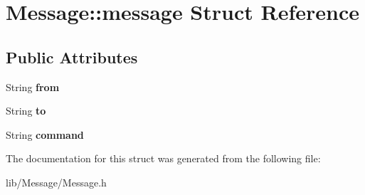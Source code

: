 \hypertarget{struct_message_1_1message}{}\section{Message\+:\+:message Struct Reference}
\label{struct_message_1_1message}
\subsection*{Public Attributes}
\begin{DoxyCompactItemize}
\item 
\mbox{\label{struct_message_1_1message_afb336c68657804a63ae70f42b0f7cde5}} 
String {\bfseries from}
\item 
\mbox{\label{struct_message_1_1message_a4714dc812be584be6e7a8c5a1fcb6a0f}} 
String {\bfseries to}
\item 
\mbox{\label{struct_message_1_1message_a0bec4dba741add4bf735663898b01741}} 
String {\bfseries command}
\end{DoxyCompactItemize}


The documentation for this struct was generated from the following file\+:\begin{DoxyCompactItemize}
\item 
lib/\+Message/Message.\+h\end{DoxyCompactItemize}
